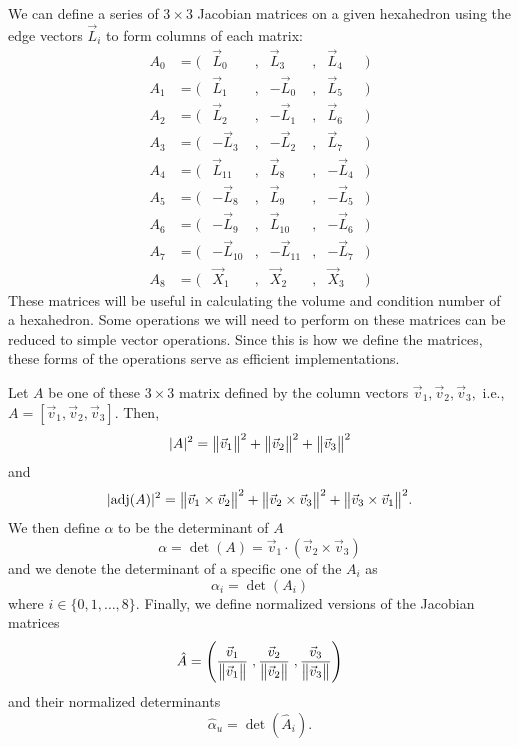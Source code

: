 We can define a series of $3\times 3$ Jacobian matrices on a given hexahedron using
the edge vectors $\vec L_i$ to form columns of each matrix:
\begin{equation*}
\begin{array}{lrrcrcrl}
A_0 &= (&  \vec L_0   &,&  \vec L_3   &,&  \vec L_4 &)\\
A_1 &= (&  \vec L_1   &,& -\vec L_0   &,&  \vec L_5 &)\\
A_2 &= (&  \vec L_2   &,& -\vec L_1   &,&  \vec L_6 &)\\
A_3 &= (& -\vec L_3   &,& -\vec L_2   &,&  \vec L_7 &)\\
A_4 &= (&  \vec L_{11}&,&  \vec L_8   &,& -\vec L_4 &)\\
A_5 &= (& -\vec L_8   &,&  \vec L_9   &,& -\vec L_5 &)\\
A_6 &= (& -\vec L_9   &,&  \vec L_{10}&,& -\vec L_6 &)\\
A_7 &= (& -\vec L_{10}&,& -\vec L_{11}&,& -\vec L_7 &)\\
A_8 &= (&  \vec X_1   &,&  \vec X_2   &,&  \vec X_3 &)
\end{array}
\end{equation*}
These matrices will be useful in calculating the volume and condition number of a hexahedron.
Some operations we will need to perform on these matrices can be reduced to simple vector operations.
Since this is how we define the matrices, these forms of the operations serve as efficient implementations.

Let $A$ be one of these $3 \times 3$ matrix defined by the
column vectors $\vec v_1, \vec v_2, \vec v_3,$ i.e., $A = [\vec v_1, \vec v_2, \vec v_3]$. 
Then, 
\[
|A|^2 = \big\lVert{\vec v_1}\big\rVert^2 + \big\lVert{\vec v_2}\big\rVert^2 + \big\lVert{\vec v_3}\big\rVert^2 
\]
and
\[
|\mathrm{adj}(A)|^2 = \big\lVert{\vec v_1 \times \vec v_2}\big\rVert^2 + 
             \big\lVert{\vec v_2 \times \vec v_3}\big\rVert^2 +
             \big\lVert{\vec v_3 \times \vec v_1}\big\rVert^2 .
\]
We then define $\alpha$ to be the determinant of $A$
\[
\alpha = \det(A) = \vec v_1 \cdot (\vec v_2 \times \vec v_3 )
\]
and we denote the determinant of a specific one of the $A_i$ as
\[
\alpha_i = \det(A_i)
\]
where $i\in\{0,1,\ldots,8\}$.
Finally, we define normalized versions of the Jacobian matrices
\[
  \hat A = \left(
    \frac{\vec v_1}{\big\lVert{\vec v_1}\big\rVert}\;,
    \frac{\vec v_2}{\big\lVert{\vec v_2}\big\rVert}\;,
    \frac{\vec v_3}{\big\lVert{\vec v_3}\big\rVert}
  \right)
\]
and their normalized determinants
\[
  \hat\alpha_u = \det\left(\hat A_i\right).
\]

